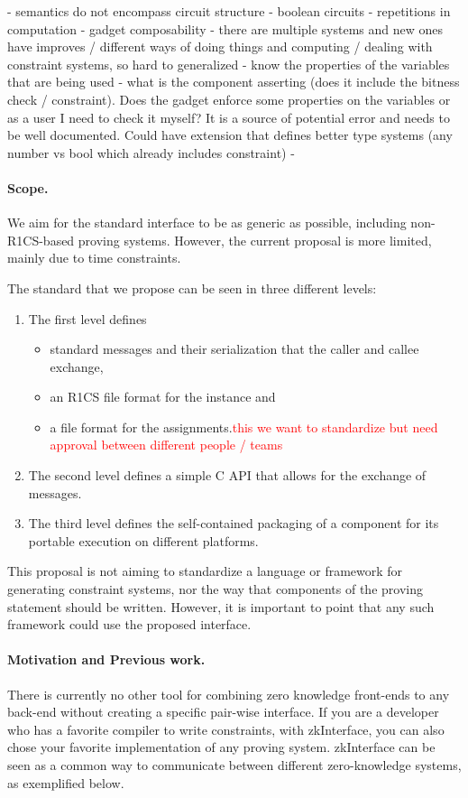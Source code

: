 \documentclass[a4paper,11pt]{article}
\newcommand\dnote[1]{\textcolor{red}{#1}}
\begin{document}
		- semantics do not encompass circuit structure
			- boolean circuits
			- repetitions in computation
		- gadget composability
		- there are multiple systems and new ones have improves / different ways of doing things and computing / dealing with constraint systems, so hard to generalized
		- know the properties of the variables that are being used - what is the component asserting (does it include the bitness check / constraint). Does the gadget enforce some properties on the variables or as a user I need to check it myself? It is a source of potential error and needs to be well documented. Could have extension that defines better type systems (any number vs bool which already includes constraint)
		- 
		
		\paragraph{Scope.} We aim for the standard interface to be as generic as possible, including non-R1CS-based proving systems. However, the current proposal is more limited, mainly due to time constraints.
		
		The standard that we propose can be seen in three different levels:
		\begin{enumerate}
			\item The first level defines  
			\begin{itemize}
				\item standard messages and their serialization that the caller and callee exchange, 
				\item an R1CS file format for the instance and 
				\item a file format for the assignments.\dnote{this we want to standardize but need approval between different people / teams}
			\end{itemize}
			\item The second level defines a simple C API that allows for the exchange of messages.
			\item The third level defines the self-contained packaging of a component for its portable execution on different platforms.
		\end{enumerate}

		This proposal is not aiming to standardize a language or framework for generating constraint systems, nor the way that components of the proving statement should be written. However, it is important to point that any such framework could use the proposed interface.
		
		\paragraph{Motivation and Previous work.} There is currently no other tool for combining zero knowledge front-ends to any back-end without creating a specific pair-wise interface. If you are a developer who has a favorite compiler to write constraints, with zkInterface, you can also chose your favorite implementation of any proving system. zkInterface can be seen as a common way to communicate between different zero-knowledge systems, as exemplified below.
		
\end{document}

